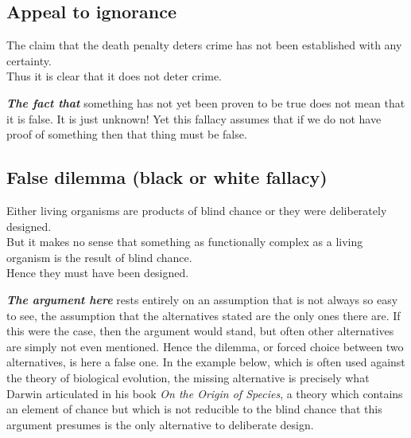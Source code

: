 \documentclass[12pt, openany]{book}
\begin{document}
\hypertarget{appeal-to-ignorance}{%
\subsection*{Appeal to ignorance}\label{appeal-to-ignorance}}


\begin{center}

\begin{argument}

The claim that the death penalty deters crime has not been established with any certainty.\\
Thus it is clear that it does not deter crime.

\end{argument}

\end{center}

\textbf{\emph{The fact that}} something has not yet been proven to be true does not mean that it is false. It is just unknown! Yet this fallacy assumes that if we do not have proof of something then that thing must be false.

\hypertarget{false-dilemma-black-or-white-fallacy}{%
\subsection*{False dilemma (black or white fallacy)}\label{false-dilemma-black-or-white-fallacy}}


\begin{center}

\begin{argument}

Either living organisms are products of blind chance or they were deliberately designed.\\
But it makes no sense that something as functionally complex as a living organism is the result of blind chance.\\

Hence they must have been designed.

\end{argument}

\end{center}

\textbf{\emph{The argument here}} rests entirely on an assumption that is not always so easy to see, the assumption that the alternatives stated are the only ones there are. If this were the case, then the argument would stand, but often other alternatives are simply not even mentioned. Hence the dilemma, or forced choice between two alternatives, is here a false one. In the example below, which is often used against the theory of biological evolution, the missing alternative is precisely what Darwin articulated in his book \emph{On the Origin of Species}, a theory which contains an element of chance but which is not reducible to the blind chance that this argument presumes is the only alternative to deliberate design.
\end{document}
